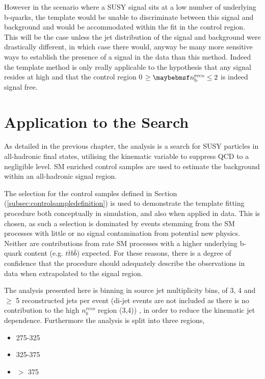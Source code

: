 However in the scenario where a \ac{SUSY} signal sits at a low number of underlying b-quarks, the template would be unable to discriminate between this signal and background and would be accommodated within the fit in the control region. This will be the case unless the jet \pt distribution of the signal and background were drastically different, in which case there would, anyway be many more sensitive ways to establish the presence of a signal in the data than this method. Indeed the template method is only really applicable to the hypothesis that any signal resides at high \nbreco and that the control region 0 $\geq \nbreco \leq 2$ is indeed signal free.  



\section{ Application to the \alphat Search}
\label{sec:templateapplication}

As detailed in the previous chapter, the \alphat analysis is a search for \ac{SUSY} particles in all-hadronic final states, utilising the kinematic variable \alphat to suppress QCD to a negligible level. \ac{SM} enriched control samples are used to estimate the background within an all-hadronic signal region. 

The selection for the \mupjets control samples defined in Section (\ref{subsec:controlsampledefinition}) is used to demonstrate the template fitting procedure both conceptually in simulation, and also when applied in data. This is chosen, as such a selection is dominated by events stemming from the \ac{SM} processes with little or no signal contamination from potential new physics. Neither are contributions from rate \ac{SM} processes with a higher underlying b-quark content (e.g. $t\bar{t}b\bar{b}$) expected. For these reasons, there is a degree of confidence that the procedure should adequately describe the observations in data when extrapolated to the signal region.

The analysis presented here is binning in source jet multiplicity bins, of 3, 4 and $\geq$ 5 reconstructed jets per event (di-jet events are not included as there is no contribution to the high $n_{b}^{reco}$ region (3,4)) , in order to reduce the kinematic jet \pt dependence. Furthermore the analysis is split into three \theht regions, 

\begin{itemize}
\item 275-325 \GeV
\item 325-375 \GeV
\item $>$ 375 \GeV
\end{itemize}

